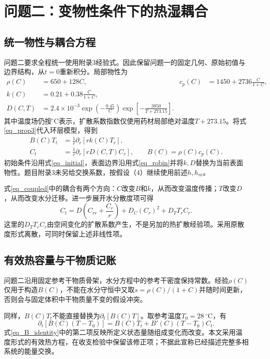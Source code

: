 \section{问题二：变物性条件下的热湿耦合}
\subsection{统一物性与耦合方程}
问题二要求全程统一使用附录3经验式。因此保留问题一的固定几何、原始初值与边界结构，从$t=0$重新积分。局部物性为
\begin{equation}\label{eq_prop3}
\begin{aligned}
\rho(C)&=650+128C,&c_p(C)&=1450+2736\frac{C}{1+C},\\
k(C)&=0.21+0.38\frac{C}{1+C},&&\\[-3pt]
D(C,T)&=2.4\times10^{-3}\exp\!\left(-\frac{0.45}{C}\right)
\exp\!\left[-\frac{3850}{T+273.15}\right].&&
\end{aligned}
\end{equation}
其中温度场仍按$^\circ$C表示，扩散系数指数仅使用药材局部绝对温度$T+273.15$。将式\eqref{eq_prop3}代入环层模型，得到
\begin{equation}\label{eq_coupled}
\boxed{\begin{aligned}
B(C)T_t&=\frac1r\partial_r[rk(C)T_r],\\
C_t&=\frac1r\partial_r[rD(C,T)C_r],\qquad B(C)=\rho(C)c_p(C).
\end{aligned}}
\end{equation}
初始条件沿用式\eqref{eq_initial}，表面边界沿用式\eqref{eq_robin}并将$k,D$替换为当前表面物性。题目附录3未另给交换系数，按假设（4）继续使用前述$h,h_m$。

式\eqref{eq_coupled}中的耦合有两个方向：$C$改变$B$和$k$，从而改变温度传播；$T$改变$D$，从而改变水分迁移。进一步展开水分散度项可得
\[
C_t=D\left(C_{rr}+\frac{C_r}{r}\right)+D_C(C_r)^2+D_TT_rC_r.
\]
这里的$D_TT_rC_r$由空间变化的扩散系数产生，不是另加的热扩散经验项。采用原散度形式离散，可同时保留上述非线性项。

\subsection{有效热容量与干物质记账}
问题二沿用固定参考干物质骨架，水分方程中的参考干密度保持常数。经验$\rho(C)$仅用于构造$B(C)$，不能在水分守恒中又取$s=\rho(C)/(1+C)$并随时间更新，否则会与固定体积中干物质量不变的假设冲突。

同样，$B(C)T_t$不能直接替换为$\partial_t[B(C)T]$。取参考温度$T_0=28\ ^\circ$C，有
\begin{equation}\label{eq_B_identity}
\partial_t[B(C)(T-T_0)]=B(C)T_t+B'(C)(T-T_0)C_t.
\end{equation}
式\eqref{eq_B_identity}中的第二项反映所定义状态量随组成变化而改变。本文采用温度形式的有效热方程，在收支检验中保留该修正项；不据此宣称已经描述完整多相系统的能量交换。

